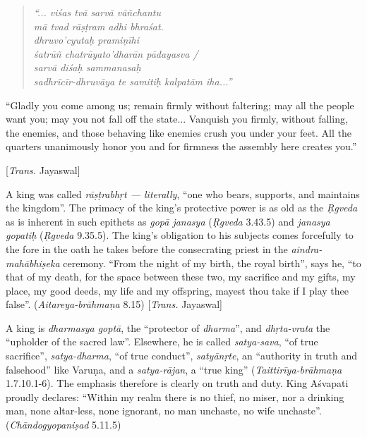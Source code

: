 \begin{quote}
{{\sl “... viśas tvā sarvā vāñchantu}}\\
{{\sl mā tvad rāṣṭram adhi bhraśat.}}\\
{{\sl dhruvo’cyutaḥ pramiṇīhi}}\\
{{\sl śatrūñ chatrūyato’dharān pādayasva /}}\\
{{\sl sarvā diśaḥ sammanasaḥ}}\\
{{\sl sadhrīcīr-dhruvāya te samitiḥ kalpatām iha...”}}\\[-.7cm]
\end{quote}



\begin{myquote}
“Gladly you come among us; remain firmly without faltering; may all the people want you; may you not fall off the state... Vanquish you firmly, without falling, the enemies, and those behaving like enemies crush you under your feet. All the quarters unanimously honor you and for firmness the assembly here creates you.”

\hfill [{\sl Trans.} Jayaswal]
\end{myquote}
\newpage

A king was called {\sl rāṣṭrabhṛt --- literally}, “one who bears, supports, and maintains the kingdom”.  The primacy of the king’s protective power is as old as the {\sl Ṛgveda} as is inherent in such epithets as {\sl gopā janasya} ({\sl Ṛgveda} 3.43.5) and {\sl janasya gopatiḥ} ({\sl Ṛgveda} 9.35.5). The king’s obligation to his subjects comes forcefully to the fore in the oath he takes before the consecrating priest in the {\sl aindra-mahābhiṣeka} ceremony. “From the night of my birth, the royal birth”, says he, “to that of my death, for the space between these two, my sacrifice and my gifts, my place, my good deeds, my life and my offspring, mayest thou take if I play thee false”. ({\sl Aitareya-brāhmaṇa} 8.15) [{\sl Trans.} Jayaswal]

A king is {\sl dharmasya goptā}, the “protector of {\sl dharma}”, and {\sl dhṛta-vrata} the “upholder of the sacred law”. Elsewhere, he is called {\sl satya-sava}, “of true sacrifice”, {\sl satya-dharma}, “of true conduct”, {\sl satyānṛte}, an “authority in truth and falsehood” like Varuṇa, and a {\sl satya-rājan}, a “true king” ({\sl Taittirīya-brāhmaṇa} 1.7.10.1-6). The emphasis therefore is clearly on truth and duty. King Aśvapati proudly declares: “Within my realm there is no thief, no miser, nor a drinking man, none altar-less, none ignorant, no man unchaste, no wife unchaste”. ({\sl Chāndogyopaniṣad} 5.11.5) 

